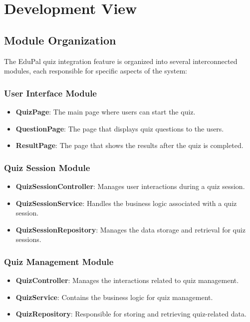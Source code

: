 \section{Development View}

\subsection{Module Organization}

The EduPal quiz integration feature is organized into several interconnected modules, each responsible for specific aspects of the system:

\subsubsection{User Interface Module}

\begin{itemize}
  \item \textbf{QuizPage}: The main page where users can start the quiz.
  \item \textbf{QuestionPage}: The page that displays quiz questions to the users.
  \item \textbf{ResultPage}: The page that shows the results after the quiz is completed.
\end{itemize}

\subsubsection{Quiz Session Module}

\begin{itemize}
  \item \textbf{QuizSessionController}: Manages user interactions during a quiz session.
  \item \textbf{QuizSessionService}: Handles the business logic associated with a quiz session.
  \item \textbf{QuizSessionRepository}: Manages the data storage and retrieval for quiz sessions.
\end{itemize}

\subsubsection{Quiz Management Module}

\begin{itemize}
  \item \textbf{QuizController}: Manages the interactions related to quiz management.
  \item \textbf{QuizService}: Contains the business logic for quiz management.
  \item \textbf{QuizRepository}: Responsible for storing and retrieving quiz-related data.
\end{itemize}

